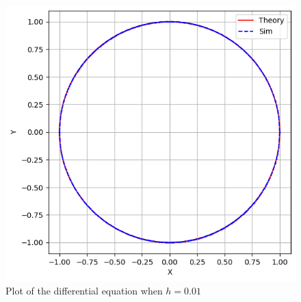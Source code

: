 \documentclass[journal]{IEEEtran}
\begin{document}
\begin{figure}[h]
    \centering
    \includegraphics[width=\columnwidth]{plots/plot.png}
    \caption{Plot of the differential equation when $h=0.01$}
    \label{fig:Plot1}
    \end{figure}
\end{document}
